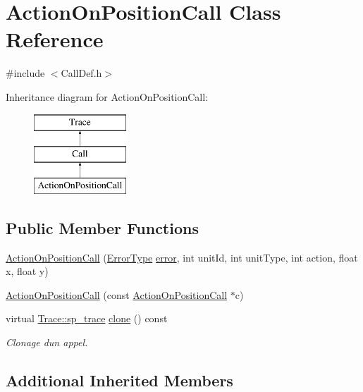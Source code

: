 \hypertarget{class_action_on_position_call}{}\section{Action\+On\+Position\+Call Class Reference}
\label{class_action_on_position_call}


{\ttfamily \#include $<$Call\+Def.\+h$>$}

Inheritance diagram for Action\+On\+Position\+Call\+:\begin{figure}[H]
\begin{center}
\leavevmode
\includegraphics[height=3.000000cm]{class_action_on_position_call}
\end{center}
\end{figure}
\subsection*{Public Member Functions}
\begin{DoxyCompactItemize}
\item 
\hyperlink{class_action_on_position_call_aee0a62cf084437f5f1a50657ed2c7b8a}{Action\+On\+Position\+Call} (\hyperlink{class_call_ade833a08ce215aaa4121102f3448c898}{Error\+Type} \hyperlink{class_call_a206f6150a8038fda48c17c2c7421aed1}{error}, int unit\+Id, int unit\+Type, int action, float x, float y)
\item 
\hyperlink{class_action_on_position_call_a9a87e633b34888a0ae3ba0514628c3f7}{Action\+On\+Position\+Call} (const \hyperlink{class_action_on_position_call}{Action\+On\+Position\+Call} $\ast$c)
\item 
virtual \hyperlink{class_trace_a9c58e523529fc8a03fb6acf3eef86150}{Trace\+::sp\+\_\+trace} \hyperlink{class_action_on_position_call_aa755b6dbfcbd7efd47251556381f6bc3}{clone} () const 
\begin{DoxyCompactList}\small\item\em Clonage d\textquotesingle{}un appel. \end{DoxyCompactList}\end{DoxyCompactItemize}
\subsection*{Additional Inherited Members}


